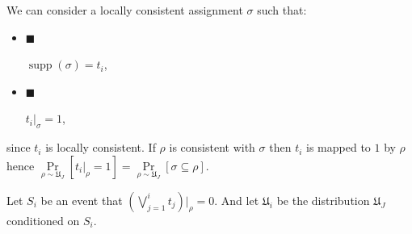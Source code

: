 \documentclass[10pt,a4paper]{article}
\begin{document}
We can consider a locally consistent assignment $\sigma$ such that:\par


\begin{itemize}


\item[] 
$\blacksquare$ 


$\operatorname*{supp}(\sigma)=t_{i}$,\par





\item[] 
$\blacksquare$ 


$t_{i}|_{\sigma}=1$,\par





\end{itemize}


since $t_{i}$ is locally consistent. If $\rho$ is consistent with $\sigma$ then $t_{i}$
is mapped to $1$ by $\rho$ hence $\Pr\limits_{\rho\sim\mathfrak{U}_{J}}[t_{i}|_{\rho}=1]=\Pr\limits_{\rho\sim%
\mathfrak{U}_{J}}[\sigma\subseteq\rho]$.\par




Let $S_{i}$ be an event that $\left(\bigvee\limits_{j=1}^{i}t_{j}\right)|_{\rho}=0$. And let
$\mathfrak{U}_{i}$ be the distribution $\mathfrak{U}_{J}$ conditioned on $S_{i}$.\par
\end{document}
